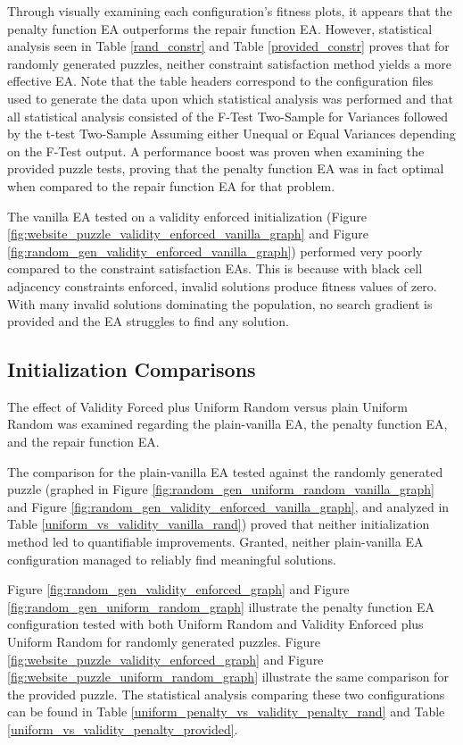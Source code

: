 \documentclass[11pt]{article}
\begin{document}
Through visually examining each configuration's fitness plots, it appears that the penalty function EA 
outperforms the repair function EA. However, statistical analysis seen in Table \ref{rand_constr} and Table \ref{provided_constr}
proves that for randomly generated puzzles, neither constraint satisfaction method yields a more effective EA. Note that the table
headers correspond to the configuration files used to generate the data upon which statistical analysis was performed and that
all statistical analysis consisted of the F-Test Two-Sample for Variances followed by the t-test Two-Sample Assuming either Unequal or
Equal Variances depending on the F-Test output.
A performance boost was proven when examining the provided puzzle tests, proving that the penalty function EA was in fact
optimal when compared to the repair function EA for that problem. 

The vanilla EA tested on a validity enforced initialization (Figure \ref{fig:website_puzzle_validity_enforced_vanilla_graph} 
and Figure \ref{fig:random_gen_validity_enforced_vanilla_graph}) performed very poorly compared to the constraint satisfaction EAs.
This is because with black cell adjacency constraints enforced, invalid solutions produce fitness values of zero. With many invalid solutions
dominating the population, no search gradient is provided and the EA struggles to find any solution.


\subsection{Initialization Comparisons}

The effect of Validity Forced plus Uniform Random versus plain Uniform Random was examined
regarding the plain-vanilla EA, the penalty function EA, and the repair function EA.

The comparison for the plain-vanilla EA tested against the randomly generated puzzle
(graphed in Figure \ref{fig:random_gen_uniform_random_vanilla_graph}
and Figure \ref{fig:random_gen_validity_enforced_vanilla_graph}, and analyzed in Table \ref{uniform_vs_validity_vanilla_rand})
proved that neither initialization method led to quantifiable improvements. Granted, neither plain-vanilla EA configuration
managed to reliably find meaningful solutions.

Figure \ref{fig:random_gen_validity_enforced_graph} and Figure \ref{fig:random_gen_uniform_random_graph} 
illustrate the penalty function EA configuration tested with both Uniform Random and 
Validity Enforced plus Uniform Random for randomly generated puzzles. Figure \ref{fig:website_puzzle_validity_enforced_graph} 
and Figure \ref{fig:website_puzzle_uniform_random_graph} illustrate
the same comparison for the provided puzzle. The statistical analysis comparing these two 
configurations can be found in Table \ref{uniform_penalty_vs_validity_penalty_rand} and Table \ref{uniform_vs_validity_penalty_provided}.
\end{document}
